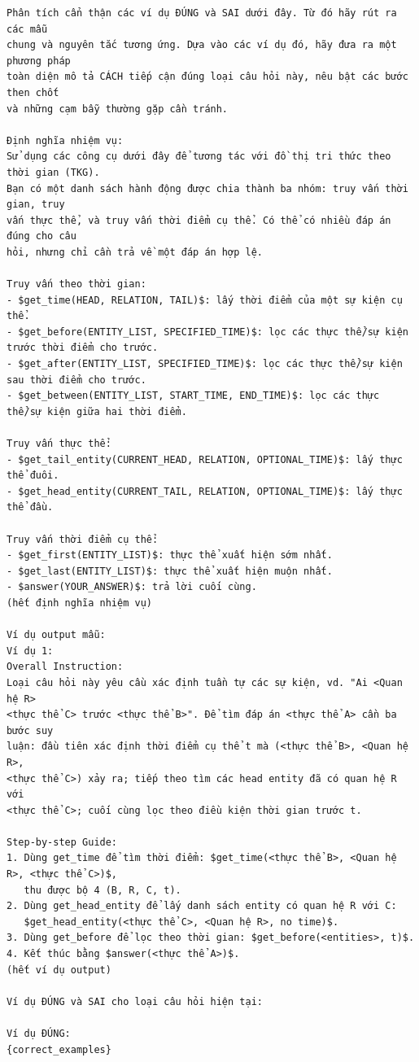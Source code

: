 \begin{lstlisting}
Phân tích cẩn thận các ví dụ ĐÚNG và SAI dưới đây. Từ đó hãy rút ra các mẫu
chung và nguyên tắc tương ứng. Dựa vào các ví dụ đó, hãy đưa ra một phương pháp
toàn diện mô tả CÁCH tiếp cận đúng loại câu hỏi này, nêu bật các bước then chốt
và những cạm bẫy thường gặp cần tránh.

Định nghĩa nhiệm vụ:
Sử dụng các công cụ dưới đây để tương tác với đồ thị tri thức theo thời gian (TKG).
Bạn có một danh sách hành động được chia thành ba nhóm: truy vấn thời gian, truy
vấn thực thể, và truy vấn thời điểm cụ thể. Có thể có nhiều đáp án đúng cho câu
hỏi, nhưng chỉ cần trả về một đáp án hợp lệ.

Truy vấn theo thời gian:
- $get_time(HEAD, RELATION, TAIL)$: lấy thời điểm của một sự kiện cụ thể.
- $get_before(ENTITY_LIST, SPECIFIED_TIME)$: lọc các thực thể/sự kiện trước thời điểm cho trước.
- $get_after(ENTITY_LIST, SPECIFIED_TIME)$: lọc các thực thể/sự kiện sau thời điểm cho trước.
- $get_between(ENTITY_LIST, START_TIME, END_TIME)$: lọc các thực thể/sự kiện giữa hai thời điểm.

Truy vấn thực thể:
- $get_tail_entity(CURRENT_HEAD, RELATION, OPTIONAL_TIME)$: lấy thực thể đuôi.
- $get_head_entity(CURRENT_TAIL, RELATION, OPTIONAL_TIME)$: lấy thực thể đầu.

Truy vấn thời điểm cụ thể:
- $get_first(ENTITY_LIST)$: thực thể xuất hiện sớm nhất.
- $get_last(ENTITY_LIST)$: thực thể xuất hiện muộn nhất.
- $answer(YOUR_ANSWER)$: trả lời cuối cùng.
(hết định nghĩa nhiệm vụ)

Ví dụ output mẫu:
Ví dụ 1:
Overall Instruction:
Loại câu hỏi này yêu cầu xác định tuần tự các sự kiện, vd. "Ai <Quan hệ R>
<thực thể C> trước <thực thể B>". Để tìm đáp án <thực thể A> cần ba bước suy
luận: đầu tiên xác định thời điểm cụ thể t mà (<thực thể B>, <Quan hệ R>,
<thực thể C>) xảy ra; tiếp theo tìm các head entity đã có quan hệ R với
<thực thể C>; cuối cùng lọc theo điều kiện thời gian trước t.

Step-by-step Guide:
1. Dùng get_time để tìm thời điểm: $get_time(<thực thể B>, <Quan hệ R>, <thực thể C>)$,
   thu được bộ 4 (B, R, C, t).
2. Dùng get_head_entity để lấy danh sách entity có quan hệ R với C:
   $get_head_entity(<thực thể C>, <Quan hệ R>, no time)$.
3. Dùng get_before để lọc theo thời gian: $get_before(<entities>, t)$.
4. Kết thúc bằng $answer(<thực thể A>)$.
(hết ví dụ output)

Ví dụ ĐÚNG và SAI cho loại câu hỏi hiện tại:

Ví dụ ĐÚNG:
{correct_examples}


\end{lstlisting}
